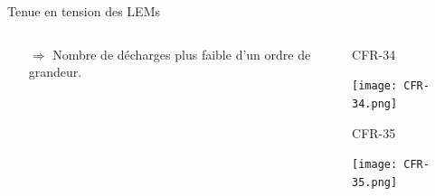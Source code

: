 \begin{frame}{Tenue en tension des LEMs}
\begin{columns}
\begin{column}{0.5\textwidth}
\begin{scriptsize}
\begin{itemize}
	    				\item[$\Rightarrow$] Nombre de décharges plus faible d'un ordre de grandeur.
	    			\end{itemize}
	    		\end{scriptsize}
    		\end{column}\hfill
    		\begin{column}{0.5\textwidth}
    			\begin{minipage}{0.48\textwidth}
    				\centering
    				\begin{scriptsize}
	    				CFR-34
	    			\end{scriptsize}
    				\texttt{[image: CFR-34.png]}
    			\end{minipage}\hfill
    			\begin{minipage}{0.48\textwidth}
    				\centering
    				\begin{scriptsize}
	    				CFR-35
    				\end{scriptsize}
    				\texttt{[image: CFR-35.png]}
    			\end{minipage}
    		\end{column}
    	\end{columns}
    \end{frame}

